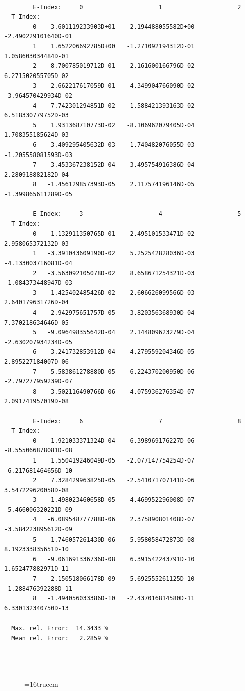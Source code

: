 \documentclass[12pt,dvips]{article}
\begin{document}
\begin{small}\begin{verbatim}

        E-Index:     0                     1                     2
  T-Index:
        0   -3.601119233903D+01    2.194488055582D+00   -2.490229101640D-01
        1    1.652206692785D+00   -1.271092194312D-01    1.058603034484D-01
        2   -8.700785019712D-01   -2.161600166796D-02    6.271502055705D-02
        3    2.662217617059D-01    4.349904766090D-02   -3.964570429934D-02
        4   -7.742301294851D-02   -1.588421393163D-02    6.518330779752D-03
        5    1.931368710773D-02   -8.106962079405D-04    1.708355185624D-03
        6   -3.409295405632D-03    1.740482076055D-03   -1.205558081593D-03
        7    3.453367238152D-04   -3.495754916386D-04    2.280918882182D-04
        8   -1.456129857393D-05    2.117574196146D-05   -1.399865611289D-05

        E-Index:     3                     4                     5
  T-Index:
        0    1.132911350765D-01   -2.495101533471D-02    2.958065372132D-03
        1   -3.391043609190D-02    5.252542828036D-03   -4.133003716081D-04
        2   -3.563092105078D-02    8.658671254321D-03   -1.084373448947D-03
        3    1.425402485426D-02   -2.606626099566D-03    2.640179631726D-04
        4    2.942975651757D-05   -3.820356368930D-04    7.370218634646D-05
        5   -9.096498355642D-04    2.144809623279D-04   -2.630207934234D-05
        6    3.241732853912D-04   -4.279559204346D-05    2.895227184007D-06
        7   -5.583861278880D-05    6.224370200950D-06   -2.797277959239D-07
        8    3.502116490766D-06   -4.075936276354D-07    2.091741957019D-08

        E-Index:     6                     7                     8
  T-Index:
        0   -1.921033371324D-04    6.398969176227D-06   -8.555066878081D-08
        1    1.550419246049D-05   -2.077147754254D-07   -6.217681464656D-10
        2    7.328429963825D-05   -2.541071707141D-06    3.547229620058D-08
        3   -1.498023460658D-05    4.469952296008D-07   -5.466006320221D-09
        4   -6.089548777788D-06    2.375890801408D-07   -3.584223895612D-09
        5    1.746057261430D-06   -5.958058472873D-08    8.192333835651D-10
        6   -9.061691336736D-08    6.391542243791D-10    1.652477882971D-11
        7   -2.150518066178D-09    5.692555261125D-10   -1.288476392288D-11
        8   -1.494056033386D-10   -2.437016814580D-11    6.330132340750D-13

  Max. rel. Error:  14.3433 %
  Mean rel. Error:   2.2859 %




\end{verbatim}\end{small}
\begin{figure} \label{2.2.15a}
\epsfxsize=16truecm
\end{figure}
\newpage
\end{document}
